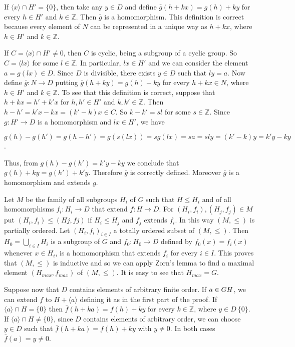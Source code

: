 \documentclass[12pt]{article}
\begin{document}
        If $ \langle x \rangle \cap H' = \{0\} $, then take any $ y \in D $ and define $ \bar{g}(h + kx) = g(h) + ky $ for every $ h \in H' $ and $ k \in \mathbb{Z} $. Then
    $ \bar{g} $ is a homomorphism. This definition is correct because every element of $ N $ can be represented in a unique way
    as $ h + kx $, where $ h \in H' $ and $ k \in \mathbb{Z} $.


        If $ C = \langle x \rangle \cap H' \neq {0} $, then $ C $ is cyclic, being a subgroup of a cyclic group. So $ C = \langle lx \rangle $ for some $l \in \mathbb{Z} $.
    In particular, $ lx \in H' $ and we can consider the element $ a = g(lx) \in D $. Since $ D $ is divisible, there exists $ y \in D $
    such that $ly = a$. Now define $ \bar{g} : N \to D $ putting $ \bar{g}(h + ky) = g(h) + ky $ for every $ h + kx \in N $, where $ h \in H' $
    and $ k \in \mathbb{Z} $. To see that this definition is correct, suppose that $h + kx = h' + k'x$ for $ h, h' \in H' $ and $ k, k' \in \mathbb{Z} $.
    Then $ h - h' = k'x - kx = (k' - k)x \in C $. So $k - k' = sl$ for some $ s \in \mathbb{Z} $. Since $ g : H' \to D $ is a homomorphism
    and $ lx \in H' $, we have


    $ g(h) - g(h') = g(h - h') = g(s(lx)) = sg(lx) = sa = sly = (k' - k)y = k'y - ky $.


        Thus, from $ g(h) - g(h') = k'y - ky $ we conclude that $ g(h) + ky = g(h') + k'y $. Therefore $ \bar{g} $ is correctly defined.
    Moreover $ \bar{g} $ is a homomorphism and extends $ g $.


        Let $ M $ be the family of all subgroups $ H_i $ of $ G $ such that $ H \leq H_i $ and of all homomorphisms $ f_i : H_i \to D $
    that extend $ f : H \to D $. For $ (H_i, f_i),(H_j , f_j ) \in M $ put $ (H_i, f_i) \leq (Hj , fj ) $ if $ H_i \leq H_j $ and $ f_j $ extends $ f_i $. In this
    way $ (M, \leq) $ is partially ordered. Let $ {(H_i, f_i)}_{i \in I} $ a totally ordered subset of $ (M, \leq) $. Then $ H_0 = \bigcup_{i \in I} H_i $ is a
    subgroup of $ G $ and $ f_0 : H_0 \to D $ defined by $ f_0 (x) = f_i (x) $ whenever $ x \in H_i $, is a homomorphism that extends
    $ f_i $ for every $ i \in I $. This proves that $ (M, \leq) $ is inductive and so we can apply Zorn's lemma to find a maximal
    element $ (H_{max}, f_{max}) $ of $ (M, \leq) $. It is easy to see that $ H_{max} = G $.


        Suppose now that $ D $ contains elements of arbitrary finite order. If $ a \in G \\ H $, we can extend $ f $ to $ H + \langle a \rangle $
    defining it as in the first part of the proof. If $ \langle a \rangle \cap H = \{0\}$ then $ \bar{f}(h + ka) = f(h) + ky $ for every $ k \in \mathbb{Z} $, where
    $ y \in D \ \{0\} $. If $ \langle a \rangle \cap H \neq \{0\} $, since $ D $ contains elements of arbitrary order, we can choose $ y \in D $ such that
    $ \bar{f}(h + ka) = f(h) + ky $ with $ y \neq 0 $. In both cases $ \bar{f}(a) = y \neq 0 $.
\end{document}

